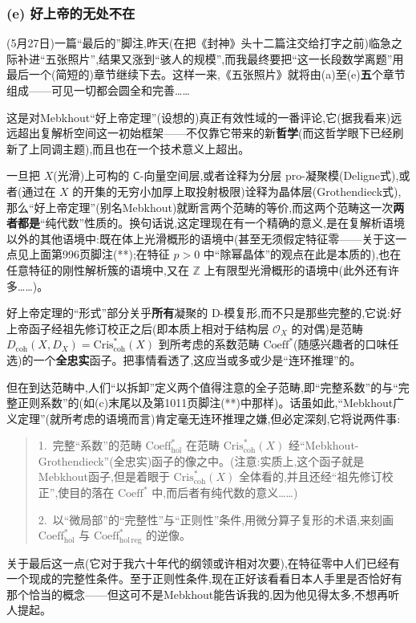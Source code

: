 \subsubsection*{(e) 好上帝的无处不在}


\noindent (5月27日)一篇“最后的”脚注,昨天(在把《封神》头十二篇注交给打字之前)临急之际补进“五张照片”,结果又涨到“骇人的规模”,而我\dmark{}最终要把“这一长段数学离题”用最后一个(简短的)章节继续下去。这样一来,《五张照片》就将由(a)至(e)\textbf{五}个章节组成——可见一切都会圆全和完善……

\noindent 这是对Mebkhout“好上帝定理”(设想的)真正有效性域的一番评论,它(据我看来)远远超出复解析空间这一初始框架——不仅靠它带来的新\textbf{哲学}(而这哲学眼下已经刷新了上同调主题),而且也在一个技术意义上超出。

\noindent 一旦把 $X$(光滑)上可构的 $\mathsf{C}$-向量空间层,或者诠释为分层 pro-凝聚模(Deligne式),或者(通过在 $X$ 的开集的无穷小加厚上取投射极限)诠释为晶体层(Grothendieck式),那么“好上帝定理”(别名Mebkhout)就断言两个范畴的等价,而这两个范畴这一次\textbf{两者都是}“纯代数”性质的。换句话说,这定理现在有一个精确的意义,是在复解析语境以外的其他语境中:既在体上光滑概形的语境中(甚至无须假定特征零——关于这一点见上面第996页脚注(**);在特征 $p>0$ 中“除幂晶体”的观点在此是本质的),也在任意特征的刚性解析簇的语境中,又在 $\mathbb{Z}$ 上有限型光滑概形的语境中(此外还有许多……)。

\noindent 好上帝定理的“形式”部分关乎\textbf{所有}凝聚的 D-模复形,而不只是那些完整的,它说:好上帝函子经祖先修订校正之后(即本质上相对于结构层 $\mathcal{O}_{X}$ 的对偶)是范畴 $D_{\mathrm{coh}}(X,D_{X})=\mathrm{Cris}^{*}_{\mathrm{coh}}(X)$ 到所考虑的系数范畴 $\mathrm{Coeff}^{*}$(随感兴趣者的口味任选)的一个\textbf{全忠实}函子。把事情看透了,这应当或多或少是“连环推理”的。

\noindent 但在到达范畴中,人们“以拆卸”定义两个值得注意的全子范畴,即“完整系数”的与“完整正则系数”的(如(c)末尾以及第1011页脚注(**)中那样)。话虽如此,“Mebkhout广义定理”(就所考虑的语境而言)肯定毫无连环推理之嫌,但必定深刻,它将说两件事:
\begin{quote}
1.~\dmark{}完整“系数”的范畴 $\mathrm{Coeff}^{*}_{\mathrm{hol}}$ 在范畴 $\mathrm{Cris}^{*}_{\mathrm{coh}}(X)$ 经“Mebkhout-Grothendieck”(全忠实)函子的像之中。(注意:实质上,这个函子就是Mebkhout函子,但是着眼于 $\mathrm{Cris}^{*}_{\mathrm{coh}}(X)$ 全体看的,并且还经“祖先修订校正”,使目的落在 $\mathrm{Coeff}^{*}$ 中,而后者有纯代数的意义……)

2.~以“微局部”的“完整性”与“正则性”条件,用微分算子复形的术语,来刻画 $\mathrm{Coeff}^{*}_{\mathrm{hol}}$ 与 $\mathrm{Coeff}^{*}_{\mathrm{hol\,reg}}$ 的逆像。
\end{quote}
关于最后这一点(它对于我六十年代的纲领或许相对次要),在特征零中人们已经有一个现成的完整性条件。至于正则性条件,现在正好该看看日本人手里是否恰好有那个恰当的概念——但这可不是Mebkhout能告诉我的,因为他见得太多,不想再听人提起。

